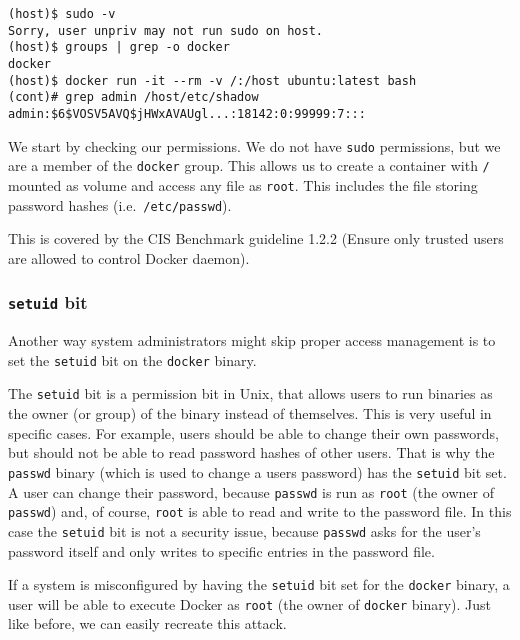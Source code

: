 \begin{lstlisting}[caption={Docker \lstinline{group} exploit example.},captionpos=b,label={listing:docker-group}]
(host)$ sudo -v
Sorry, user unpriv may not run sudo on host.
(host)$ groups | grep -o docker
docker
(host)$ docker run -it --rm -v /:/host ubuntu:latest bash
(cont)# grep admin /host/etc/shadow
admin:$6$VOSV5AVQ$jHWxAVAUgl...:18142:0:99999:7:::
\end{lstlisting}

We start by checking our permissions. We do not have \lstinline{sudo} permissions, but we are a member of the \lstinline{docker} group. This allows us to create a container with \lstinline{/} mounted as volume and access any file as \lstinline{root}. This includes the file storing password hashes (i.e.\ \lstinline{/etc/passwd}).

\hfill

This is covered by the CIS Benchmark guideline 1.2.2 (Ensure only trusted users are allowed to control Docker daemon).

\subsubsection{\texorpdfstring{\lstinline{setuid}}{setuid} bit}\label{subsubsection:setuid}
Another way system administrators might skip proper access management is to set the \lstinline{setuid} bit on the \lstinline{docker} binary.

\hfill

The \lstinline{setuid} bit is a permission bit in Unix, that allows users to run binaries as the owner (or group) of the binary instead of themselves.
This is very useful in specific cases. For example, users should be able to change their own passwords, but should not be able to read password hashes of other users. That is why the \lstinline{passwd} binary (which is used to change a users password) has the \lstinline{setuid} bit set. A user can change their password, because \lstinline{passwd} is run as \lstinline{root} (the owner of \lstinline{passwd}) and, of course, \lstinline{root} is able to read and write to the password file. In this case the \lstinline{setuid} bit is not a security issue, because \lstinline{passwd} asks for the user's password itself and only writes to specific entries in the password file.

\hfill

If a system is misconfigured by having the \lstinline{setuid} bit set for the \lstinline{docker} binary, a user will be able to execute Docker as \lstinline{root} (the owner of \lstinline{docker} binary). Just like before, we can easily recreate this attack.

